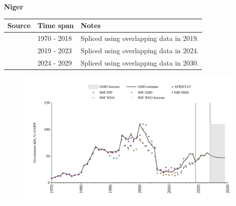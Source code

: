 \documentclass[12pt,a4paper,landscape]{article}
\begin{document}
\begin{adjustbox}{max totalsize={\paperwidth}{\paperheight},center}
\begin{minipage}[t][\textheight][t]{\textwidth}
\vspace*{0.5cm}
{}
\begin{center}
{\Large\bfseries Niger}
\end{center}
\vspace{0.5cm}
\begin{table}[H]
\centering
\small
\begin{tabular}{|l|l|l|}
\hline
\textbf{Source} & \textbf{Time span} & \textbf{Notes} \\
\hline
\rowcolor{white}\cite{IMF_GDD}& 1970 - 2018 &Spliced using overlapping data in 2019.\\
\rowcolor{lightgray}\cite{IMF_FPP}& 2019 - 2023 &Spliced using overlapping data in 2024.\\
\rowcolor{white}\cite{IMF_WEO_forecast}& 2024 - 2029 &Spliced using overlapping data in 2030.\\
\hline
\end{tabular}
\end{table}
\begin{figure}[H]
\centering
\includegraphics[width=\textwidth,height=0.6\textheight,keepaspectratio]{graphs/NER_govdebt_GDP.pdf}
\end{figure}
\end{minipage}
\end{adjustbox}
\end{document}
